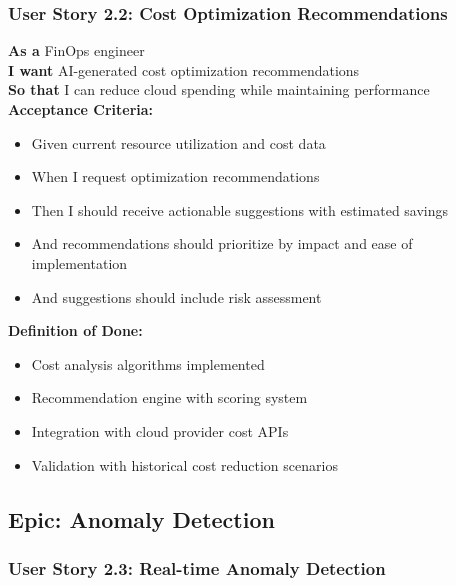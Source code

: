 \subsubsection{User Story 2.2: Cost Optimization Recommendations}

\begin{tcolorbox}[colback=lightgray, colframe=primaryblue, title=US-2.2: Cost Optimization Recommendations]
\textbf{As a} FinOps engineer \\
\textbf{I want} AI-generated cost optimization recommendations \\
\textbf{So that} I can reduce cloud spending while maintaining performance \\

\textbf{Acceptance Criteria:}
\begin{itemize}
    \item Given current resource utilization and cost data
    \item When I request optimization recommendations
    \item Then I should receive actionable suggestions with estimated savings
    \item And recommendations should prioritize by impact and ease of implementation
    \item And suggestions should include risk assessment
\end{itemize}

\textbf{Definition of Done:}
\begin{itemize}
    \item Cost analysis algorithms implemented
    \item Recommendation engine with scoring system
    \item Integration with cloud provider cost APIs
    \item Validation with historical cost reduction scenarios
\end{itemize}
\end{tcolorbox}

\subsection{Epic: Anomaly Detection}

\subsubsection{User Story 2.3: Real-time Anomaly Detection}

